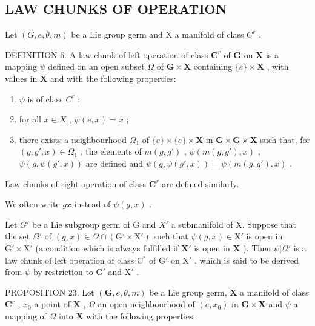 \subsection{LAW CHUNKS OF OPERATION}

Let \((G, e, \theta, m)\) be a Lie group germ and X a manifold of class \(C^r\) .

DEFINITION 6. A law chunk of left operation of class \(\mathbf{C}^r\) of \(\mathbf{G}\) on \(\mathbf{X}\) is a mapping \(\psi\) defined on an open subset \(\Omega\) of \(\mathbf{G} \times \mathbf{X}\) containing \(\{e\} \times \mathbf{X}\) , with values in \(\mathbf{X}\) and with the following properties:

\begin{enumerate}
\def\labelenumi{(\roman{enumi})}
\item
  \(\psi\) is of class \(C^{r}\) ;
\item
  for all \(x \in X\) , \(\psi(e, x) = x\) ;
\item
  there exists a neighbourhood \(\Omega_1\) of \(\{e\} \times \{e\} \times \mathbf{X}\) in \(\mathbf{G} \times \mathbf{G} \times \mathbf{X}\) such that, for \((g, g', x) \in \Omega_1\) , the elements of \(m(g, g')\) , \(\psi(m(g, g'), x)\) , \(\psi(g, \psi(g', x))\) are defined and \(\psi(g, \psi(g', x)) = \psi(m(g, g'), x)\) .
\end{enumerate}

Law chunks of right operation of class \(\mathbf{C}^r\) are defined similarly.

We often write \(gx\) instead of \(\psi(g, x)\) .

Let \(G'\) be a Lie subgroup germ of G and \(X'\) a submanifold of X. Suppose that the set \(\Omega'\) of \((g,x)\in \Omega \cap (\mathrm{G}'\times \mathrm{X}')\) such that \(\psi (g,x)\in \mathrm{X}'\) is open in \(\mathrm{G}'\times \mathrm{X}'\) (a condition which is always fulfilled if \(\mathbf{X}'\) is open in \(\mathbf{X}\) ). Then \(\psi |\Omega '\) is a law chunk of left operation of class \(\mathrm{C}^r\) of \(\mathrm{G}'\) on \(\mathrm{X}'\) , which is said to be derived from \(\psi\) by restriction to \(\mathrm{G}'\) and \(\mathrm{X}'\) .

PROPOSITION 23. Let \((\mathbf{G}, e, \theta, m)\) be a Lie group germ, \(\mathbf{X}\) a manifold of class \(\mathbf{C}^r\) , \(x_0\) a point of \(\mathbf{X}\) , \(\Omega\) an open neighbourhood of \((e, x_0)\) in \(\mathbf{G} \times \mathbf{X}\) and \(\psi\) a mapping of \(\Omega\) into \(\mathbf{X}\) with the following properties:

